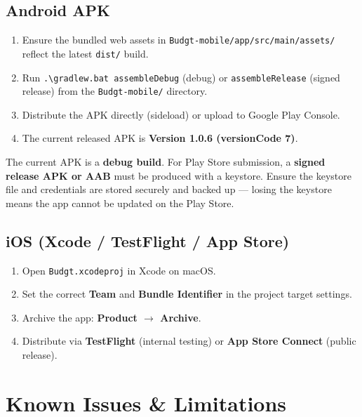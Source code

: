 \documentclass[12pt, a4paper]{article}
\begin{document}
\subsection{Android APK}

\begin{enumerate}[leftmargin=1.5em]
  \item Ensure the bundled web assets in \texttt{Budgt-mobile/app/src/main/assets/} reflect the latest \texttt{dist/} build.
  \item Run \texttt{.\textbackslash{}gradlew.bat assembleDebug} (debug) or \texttt{assembleRelease} (signed release) from the \texttt{Budgt-mobile/} directory.
  \item Distribute the APK directly (sideload) or upload to Google Play Console.
  \item The current released APK is \textbf{Version 1.0.6 (versionCode 7)}.
\end{enumerate}

\begin{cautionbox}
The current APK is a \textbf{debug build}. For Play Store submission, a \textbf{signed release APK or AAB} must be produced with a keystore. Ensure the keystore file and credentials are stored securely and backed up --- losing the keystore means the app cannot be updated on the Play Store.
\end{cautionbox}

\subsection{iOS (Xcode / TestFlight / App Store)}

\begin{enumerate}[leftmargin=1.5em]
  \item Open \texttt{Budgt.xcodeproj} in Xcode on macOS.
  \item Set the correct \textbf{Team} and \textbf{Bundle Identifier} in the project target settings.
  \item Archive the app: \textbf{Product $\rightarrow$ Archive}.
  \item Distribute via \textbf{TestFlight} (internal testing) or \textbf{App Store Connect} (public release).
\end{enumerate}

\section{Known Issues \& Limitations}
\end{document}
